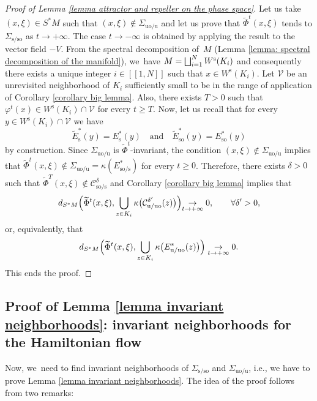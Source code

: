 \documentclass[11pt]{article}
\newcommand{\ie}{i.e.,\xspace}
\newcommand{\Subsection}{\subsection}
\let\oldbigsqcup\bigsqcup
\renewcommand{\bigsqcup}{\mathop{\textstyle\oldbigsqcup}\displaylimits}
\newcommand{\lcr}{[\![}
\newcommand{\rcr}{]\!]}
\newcommand{\rs}{\mathrm{s}}
\newcommand{\rso}{\mathrm{so}}
\newcommand{\ru}{\mathrm{u}}
\newcommand{\ruo}{\mathrm{uo}}
\theoremstyle{definition}
\theoremstyle{plain}
\newcommand{\Ccal}{\mathcal{C}}
\newcommand{\Vcal}{\mathcal{V}}
\begin{document}
\begin{proof}[Proof of Lemma \ref{lemma attractor and repeller on the phase space}] Let us take $(x,\xi) \in S^* M$ such that $(x,\xi) \notin \Sigma_{\ruo/\ru}$ and let us prove that $\widetilde{\Phi}^t (x, \xi)$ tends to $\Sigma_{\rs/\rso}$ as $t \to +\infty$. The case $t\to-\infty$ is obtained by applying the result to the vector field $-V$. From the spectral decomposition of~$M$ (Lemma \ref{lemma: spectral decomposition of the manifold}), we~have $M = \bigsqcup_{i = 1}^N W^\rs (K_i)$ and consequently there exists a unique integer $i\in\lcr1,N\rcr$ such that $x \in W^\rs (K_i)$. Let $\Vcal$ be an unrevisited neighborhood of $K_i$ sufficiently small to be in the range of application of Corollary \ref{corollary big lemma}. Also, there exists $T > 0$ such that $\varphi^t (x) \in W^\rs (K_i) \cap \Vcal$ for every $t \geq T$. Now, let us recall that for every $y \in W^\rs (K_i) \cap \Vcal$ we have
\[
\widetilde{E}_\rs^* (y) = E_\rs^* (y) \quad \text{and} \quad \widetilde{E}_{\rso}^* (y) = E_{\rso}^* (y)
\]
by construction. Since $\Sigma_{\ruo/\ru}$ is $\widetilde{\Phi}^t$-invariant, the condition $(x,\xi) \notin \Sigma_{\ruo/\ru} $ implies that $\widetilde{\Phi}^t (x,\xi) \notin \Sigma_{\ruo/\ru} = \kappa(E_{\rso/\rs}^*)$ for every $t \geq 0$. Therefore, there exists $\delta > 0$ such that $ \widetilde{\Phi}^T (x,\xi) \notin \Ccal_{\rso/\rs}^{\delta}$ and Corollary \ref{corollary big lemma} implies that
\[
d_{S^* M} \Bigl(\widetilde{\Phi}^t (x,\xi), \bigcup_{z \in K_i} \kappa \bigl(\Ccal_{\ru/\ruo}^{\delta'} (z) \bigr) \Bigl) \underset{t \to +\infty}{\to} 0, \qquad \forall \delta' > 0,
\]
or, equivalently, that
\[
d_{S^* M} \Bigl(\widetilde{\Phi}^t (x,\xi), \bigcup_{z \in K_i } \kappa \bigl(E_{\ru/\ruo}^* (z)\bigr) \Bigr) \underset{t \to +\infty}{\to} 0.
\]
This ends the proof.
\end{proof}

\Subsection{Proof of Lemma \ref{lemma invariant neighborhoods}: invariant neighborhoods for the Hamiltonian flow}\label{subsection: Lemma invariant neighborhoods for the Hamiltonian flow}

Now, we~need to find invariant neighborhoods of $\Sigma_{\rs/\rso}$ and $\Sigma_{\ruo/\ru}$, \ie we have to prove Lemma \ref{lemma invariant neighborhoods}. The idea of the proof follows from two remarks:
\end{document}
